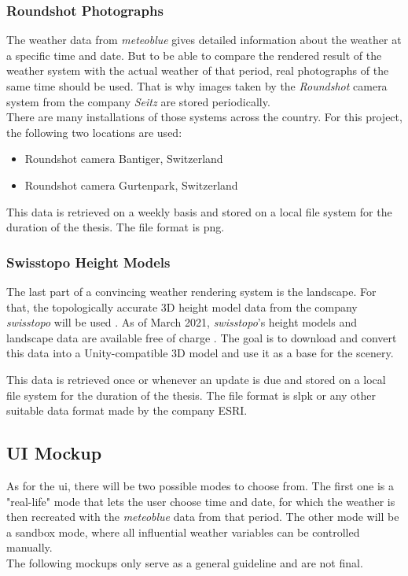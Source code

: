 \subsubsection{Roundshot Photographs}
The weather data from \emph{meteoblue} gives detailed information about the weather at a specific time and date.
But to be able to compare the rendered result of the weather system with the actual weather of that period, real photographs of the same time should be used.
That is why images taken by the \emph{Roundshot} camera system from the company \emph{Seitz} \cite{roundshot} are stored periodically.
\\
There are many installations of those systems across the country. For this project, the following two locations are used: 
\begin{itemize}
    \item Roundshot camera Bantiger, Switzerland \cite{bantiger}
    \item Roundshot camera Gurtenpark, Switzerland \cite{gurtenpark}
\end{itemize}

\noindent
This data is retrieved on a weekly basis and stored on a local file system for the duration of the thesis. The file format is \gls{png}.

\subsubsection{Swisstopo Height Models}
The last part of a convincing weather rendering system is the landscape. For that, the topologically accurate 3D height model data from the company \emph{swisstopo} will be used \cite{swisstopo}.
As of March 2021, \emph{swisstopo}'s height models and landscape data are available free of charge \cite{swisstopo:free}.
The goal is to download and convert this data into a Unity-compatible 3D model and use it as a base for the scenery.

\noindent
This data is retrieved once or whenever an update is due and stored on a local file system for the duration of the thesis. The file format is \gls{slpk} or any other suitable data format made by the company ESRI.

\clearpage

\subsection{UI Mockup}
As for the \gls{ui}, there will be two possible modes to choose from.
The first one is a "real-life" mode that lets the user choose time and date, for which the weather is then recreated with the \emph{meteoblue} data from that period.
The other mode will be a sandbox mode, where all influential weather variables can be controlled manually.
\\
The following mockups only serve as a general guideline and are not final.

